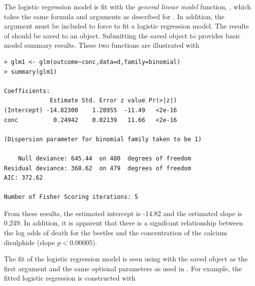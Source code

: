 \documentclass[10pt,openany]{book}\usepackage[]{graphicx}\usepackage[]{color}
\makeatletter
\newenvironment{kframe}{%
 \def\at@end@of@kframe{}%
 \ifinner\ifhmode%
  \def\at@end@of@kframe{\end{minipage}}%
  \begin{minipage}{\columnwidth}%
 \fi\fi%
 \def\FrameCommand##1{\hskip\@totalleftmargin \hskip-\fboxsep
 \colorbox{shadecolor}{##1}\hskip-\fboxsep
     \hskip-\linewidth \hskip-\@totalleftmargin \hskip\columnwidth}%
 \MakeFramed {\advance\hsize-\width
   \@totalleftmargin\z@ \linewidth\hsize
   \@setminipage}}%
 {\par\unskip\endMakeFramed%
 \at@end@of@kframe}
\newenvironment{knitrout}{}{} %
\makeatother
\begin{document}
The logistic regression model is fit with the \emph{general linear model} function, , which takes the same formula and  arguments as described for .  In addition, the  argument must be included to force  to fit a logistic regression model.  The results of  should be saved to an object.  Submitting the saved  object to  provides basic model summary results.  These two functions are illustrated with
\begin{knitrout}
\color{fgcolor}\begin{kframe}
\begin{verbatim}
> glm1 <- glm(outcome~conc,data=d,family=binomial)
> summary(glm1)

Coefficients:
             Estimate Std. Error z value Pr(>|z|)
(Intercept) -14.82300    1.28955  -11.49   <2e-16
conc          0.24942    0.02139   11.66   <2e-16

(Dispersion parameter for binomial family taken to be 1)

    Null deviance: 645.44  on 480  degrees of freedom
Residual deviance: 368.62  on 479  degrees of freedom
AIC: 372.62

Number of Fisher Scoring iterations: 5
\end{verbatim}
\end{kframe}
\end{knitrout}
From these results, the estimated intercept is -14.82 and the estimated slope is 0.249.  In addition, it is apparent that there is a signifcant relationship between the log odds of death for the beetles and the concentration of the calcium disulphide (slope $p<0.00005$).

The fit of the logistic regression model is seen using  with the saved  object as the first argument and the same optional parameters as used in .  For example, the fitted logistic regression  is constructed with
\end{document}
